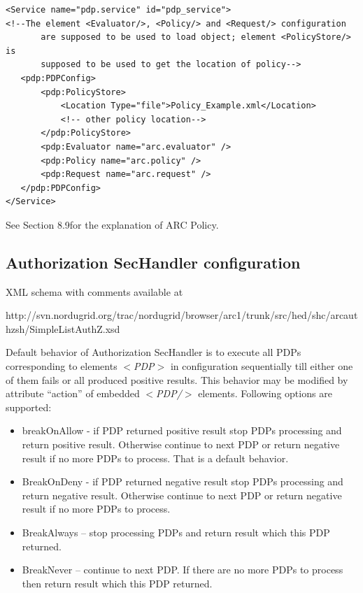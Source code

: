 \documentclass{article}                            %
\begin{document}
\begin{verbatim}
<Service name="pdp.service" id="pdp_service">
<!--The element <Evaluator/>, <Policy/> and <Request/> configuration
       are supposed to be used to load object; element <PolicyStore/> is
       supposed to be used to get the location of policy-->
   <pdp:PDPConfig>
       <pdp:PolicyStore>
           <Location Type="file">Policy_Example.xml</Location>
           <!-- other policy location-->
       </pdp:PolicyStore>
       <pdp:Evaluator name="arc.evaluator" />
       <pdp:Policy name="arc.policy" />
       <pdp:Request name="arc.request" />
   </pdp:PDPConfig>
</Service>
\end{verbatim}

See Section 8.9for the explanation of ARC Policy.


\subsection{Authorization SecHandler configuration} %
\label{subsec:authzhandler_conf}
XML schema with comments available at 

http://svn.nordugrid.org/trac/nordugrid/browser/arc1/trunk/src/hed/shc/arcauthzsh/SimpleListAuthZ.xsd

Default behavior of Authorization SecHandler is to execute all PDPs corresponding to elements \textit{$<$PDP$>$} in configuration sequentially till either one of them fails or all produced positive results. This behavior may be modified by attribute ``action'' of embedded \textit{$<$PDP/$>$} elements. Following options are supported:

    \begin{itemize}
        \item breakOnAllow - if PDP returned positive result stop PDPs processing and return positive result. Otherwise continue to next PDP or return negative result if no more PDPs to process. That is a default behavior.
        \item BreakOnDeny - if PDP returned negative result stop PDPs processing and return negative result. Otherwise continue to next PDP or return negative result if no more PDPs to process.
        \item BreakAlways – stop processing PDPs and return result which this PDP returned.
        \item BreakNever – continue to next PDP. If there are no more PDPs to process then return result which this PDP returned.
    \end{itemize}
\end{document}
